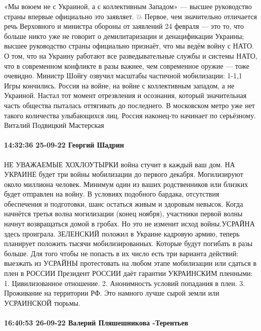 «Мы воюем не с Украиной, а с коллективным Западом» — высшее руководство страны впервые официально это заявляет.
💥 Первое, чем значительно отличается речь Верховного и министра обороны от заявлений 24 февраля — это то, что больше никто уже не говорит о демилитаризации и денацификации Украины; высшее руководство страны официально признаёт, что мы ведём войну с НАТО.
О том, что на Украину работают все разведывательные службы и системы НАТО, что в современном конфликте в разы важнее, чем современное оружие — тоже очевидно. Министр Шойгу озвучил масштабы частичной мобилизации: 1-1,1%
Игры кончились. Россия на войне, на войне с коллективным западом, а не Украиной. Настал тот момент отрезвления и осознания, который значительная часть общества пыталась оттягивать до последнего.
В московском метро уже нет такого количества улыбающихся лиц. Россия наконец-то начинает по серьёзному.
Виталий Подвицкий Мастерская

\paragraph{14:32:36 25-09-22 Георгий Шадрин}

НЕ УВАЖАЕМЫЕ ХОХЛОУТЫРКИ война стучит в каждый ваш дом.
НА УКРАИНЕ будет три войны мобилизации до первого декабря.
Могилизируют около миллиона человек. Минимум один из ваших родственников или близких будет отправлен на войну.
В условиях подобного бардака, отсутствия обеспечения и подготовки, шанс остаться живым и здоровым невысок.
Когда начнётся третья волна могилизации (конец ноября), участники первой волны начнут возвращаться домой в гробах.
Но это не изменит исход войны.УСРАЙНА здесь проиграла.
ЗЕЛЕНСКИЙ положил в Украине кадровую армию, теперь планирует положить тысячи мобилизированных.
Которые будут погибать в разы больше.
Для того чтобы не попасть в их число есть три варианта действий: выезжать из УСРАЙНЫ протестовать на любом этапе мобилизации или сдаться в плен в РОССИИ
Президент РОССИИ даёт гарантии УКРАИНСКИМ пленными:
1. Цивилизованное отношение.
2. Анонимность условий попадания в плен.
3. Проживание на территории РФ.
Это намного лучше сырой земли или УСРАИНСКОЙ тюрьмы.


\paragraph{16:40:53 26-09-22 Валерий Пляшешникова -Терентьев}

